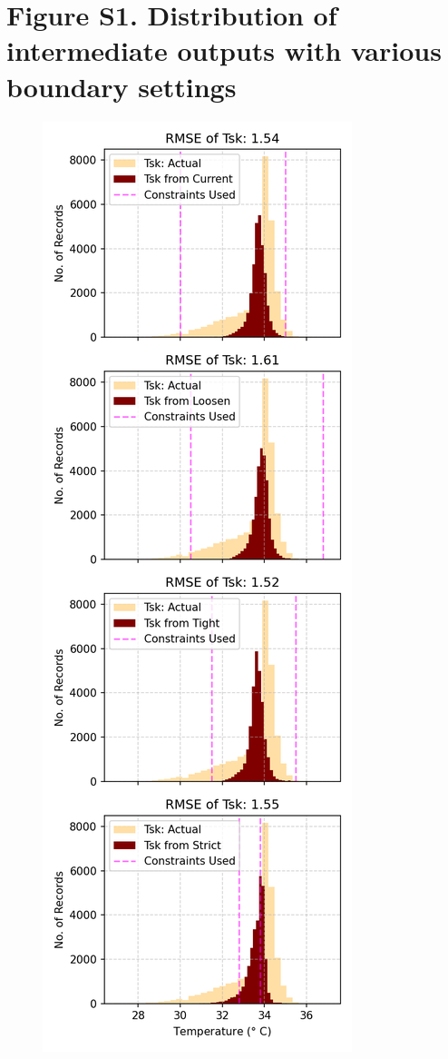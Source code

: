 \documentclass[1p]{elsarticle}
\begin{document}
\section*{Figure S1. Distribution of intermediate outputs with various boundary settings}
\begin{figure}[H]
    \centering
    \includegraphics[width=0.49\linewidth]{figures/Tsk_dist.png}

\end{figure}
\end{document}
